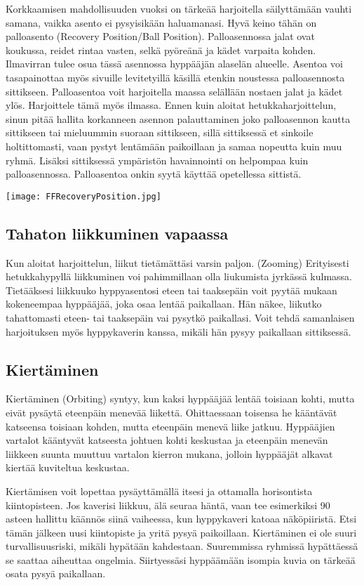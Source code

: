 Korkkaamisen mahdollisuuden vuoksi on tärkeää harjoitella säilyttämään vauhti samana, vaikka asento ei pysyisikään haluamanasi. Hyvä keino tähän on palloasento (Recovery Position/Ball Position). Palloasennossa jalat ovat koukussa, reidet rintaa vasten, selkä pyöreänä ja kädet varpaita kohden. Ilmavirran tulee osua tässä asennossa hyppääjän alaselän alueelle. Asentoa voi tasapainottaa myös sivuille levitetyillä käsillä etenkin noustessa palloasennosta sittikseen. Palloasentoa voit harjoitella maassa selällään nostaen jalat ja kädet ylös. Harjoittele tämä myös ilmassa. Ennen kuin aloitat hetukkaharjoittelun, sinun pitää hallita korkanneen asennon palauttaminen joko palloasennon kautta sittikseen tai mieluummin suoraan sittikseen, sillä sittiksessä et sinkoile holtittomasti, vaan pystyt lentämään paikoillaan ja samaa nopeutta kuin muu ryhmä. Lisäksi sittiksessä ympäristön havainnointi on helpompaa kuin palloasennossa. Palloasentoa onkin syytä käyttää opetellessa sittistä. 


\begin{Figure}\centering\texttt{[image: FFRecoveryPosition.jpg]}\end{Figure} 

\subsection{ Tahaton liikkuminen vapaassa }
\label{turvallisuus-freehyppaamisessa-tahaton-liikkuminen-vapaassa}


Kun aloitat harjoittelun, liikut tietämättäsi varsin paljon. (Zooming) Erityisesti hetukkahypyllä liikkuminen voi pahimmillaan olla liukumista jyrkässä kulmassa. Tietääksesi liikkuuko hyppyasentosi eteen tai taaksepäin voit pyytää mukaan kokeneempaa hyppääjää, joka osaa lentää paikallaan. Hän näkee, liikutko tahattomasti eteen- tai taaksepäin vai pysytkö paikallasi. Voit tehdä samanlaisen harjoituksen myös hyppykaverin kanssa, mikäli hän pysyy paikallaan sittiksessä. 

\subsection{ Kiertäminen }
\label{turvallisuus-freehyppaamisessa-kiertaminen}


Kiertäminen (Orbiting) syntyy, kun kaksi hyppääjää lentää toisiaan kohti, mutta eivät pysäytä eteenpäin menevää liikettä. Ohittaessaan toisensa he kääntävät katseensa toisiaan kohden, mutta eteenpäin menevä liike jatkuu. Hyppääjien vartalot kääntyvät katseesta johtuen kohti keskustaa ja eteenpäin menevän liikkeen suunta muuttuu vartalon kierron mukana, jolloin hyppääjät alkavat kiertää kuviteltua keskustaa. 


Kiertämisen voit lopettaa pysäyttämällä itsesi ja ottamalla horisontista kiintopisteen. Jos kaverisi liikkuu, älä seuraa häntä, vaan tee esimerkiksi 90 asteen hallittu käännös siinä vaiheessa, kun hyppykaveri katoaa näköpiiristä. Etsi tämän jälkeen uusi kiintopiste ja yritä pysyä paikoillaan. Kiertäminen ei ole suuri turvallisuusriski, mikäli hypätään kahdestaan. Suuremmissa ryhmissä hypättäessä se saattaa aiheuttaa ongelmia. Siirtyessäsi hyppäämään isompia kuvia on tärkeää osata pysyä paikallaan. 

